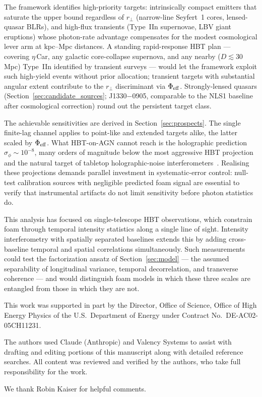 \documentclass[aps,prd,onecolumn,amsmath,amssymb]{revtex4-2}
\begin{document}
The framework identifies high-priority targets: intrinsically compact
emitters that saturate the upper bound regardless of $r_\perp$
(narrow-line Seyfert~1 cores, lensed-quasar BLRs), and high-flux
transients (Type~IIn supernovae, LBV giant eruptions) whose
photon-rate advantage compensates for the modest cosmological lever arm
at kpc--Mpc distances.  A standing rapid-response HBT plan --- covering
$\eta$\,Car, any galactic core-collapse supernova, and any nearby
($D \lesssim 30$\,Mpc) Type~IIn identified by transient surveys ---
would let the framework exploit such high-yield events without prior
allocation; transient targets with substantial angular extent contribute
to the $r_\perp$ discriminant via $\Phi_{\rm eff}$.  Strongly-lensed
quasars (Section~\ref{sec:candidate_sources}; J1330$-$0905, comparable to
the NLS1 baseline after cosmological correction) round out the persistent
target class.

The achievable sensitivities are derived in Section~\ref{sec:prospects}.
The single finite-lag channel applies to point-like and extended
targets alike, the latter scaled by $\Phi_{\rm eff}$.  What HBT-on-AGN
cannot reach is the holographic prediction $\sigma_\phi \sim 10^{-8}$,
many orders of magnitude below the most aggressive HBT projection and
the natural target of tabletop holographic-noise
interferometers~\cite{VerlindeZurek2021}.  Realising these projections
demands parallel investment in systematic-error control: null-test
calibration sources with negligible predicted foam signal are essential
to verify that instrumental artifacts do not limit sensitivity before
photon statistics do.

This analysis has focused on single-telescope HBT observations, which
constrain foam through temporal intensity statistics along a single line of
sight.
Intensity interferometry with spatially separated baselines extends this by
adding cross-baseline temporal and spatial correlations simultaneously.
Such measurements could test the factorization ansatz of
Section~\ref{sec:model} --- the assumed separability of longitudinal variance,
temporal decorrelation, and transverse coherence --- and would distinguish
foam models in which these three scales are entangled from those in which
they are not.

\begin{acknowledgments}
This work was supported in part by the Director, Office of Science, Office of
High Energy Physics of the U.S.\ Department of Energy under Contract No.\
DE-AC02-05CH11231.

The authors used Claude (Anthropic) and Valency Systems to assist with drafting and editing portions of this manuscript along with detailed reference searches. All content was reviewed and verified by the authors, who take full responsibility for the work.

We thank Robin Kaiser for helpful comments.
\end{acknowledgments}
\end{document}
